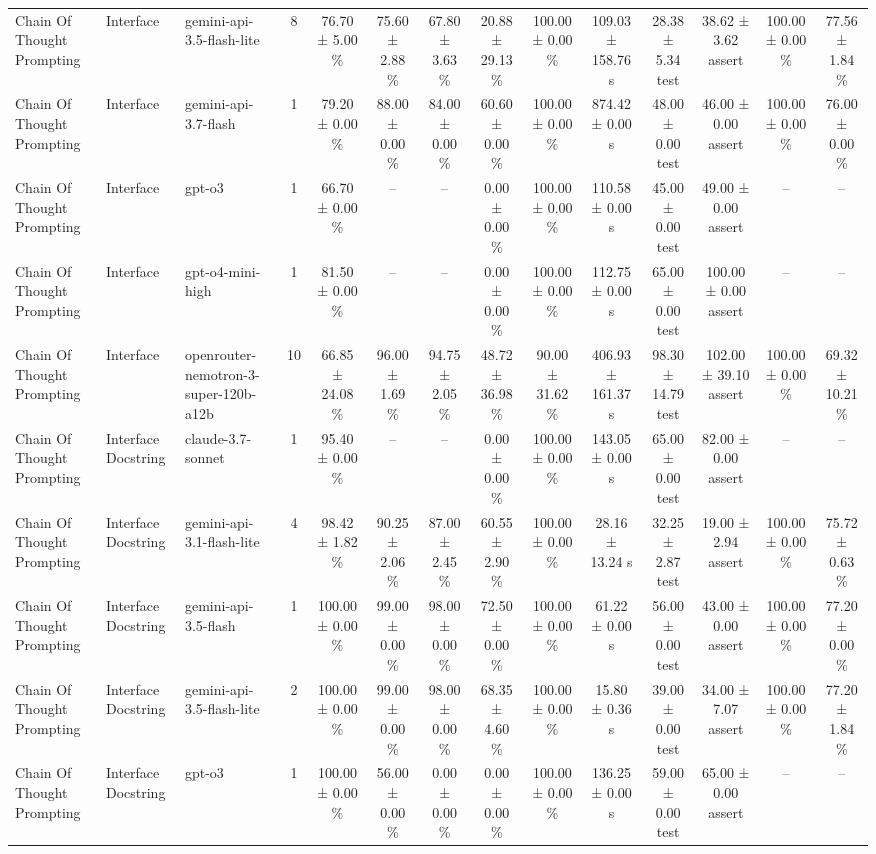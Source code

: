 \begin{table}[htbp]
\begin{tabular}{lllccccccccccc}
Chain Of Thought Prompting & Interface & gemini-api-3.5-flash-lite & 8 & 76.70 ± 5.00 \% & 75.60 ± 2.88 \% & 67.80 ± 3.63 \% & 20.88 ± 29.13 \% & 100.00 ± 0.00 \% & 109.03 ± 158.76 s & 28.38 ± 5.34 test & 38.62 ± 3.62 assert & 100.00 ± 0.00 \% & 77.56 ± 1.84 \% \\
Chain Of Thought Prompting & Interface & gemini-api-3.7-flash & 1 & 79.20 ± 0.00 \% & 88.00 ± 0.00 \% & 84.00 ± 0.00 \% & 60.60 ± 0.00 \% & 100.00 ± 0.00 \% & 874.42 ± 0.00 s & 48.00 ± 0.00 test & 46.00 ± 0.00 assert & 100.00 ± 0.00 \% & 76.00 ± 0.00 \% \\
Chain Of Thought Prompting & Interface & gpt-o3 & 1 & 66.70 ± 0.00 \% & – & – & 0.00 ± 0.00 \% & 100.00 ± 0.00 \% & 110.58 ± 0.00 s & 45.00 ± 0.00 test & 49.00 ± 0.00 assert & – & – \\
Chain Of Thought Prompting & Interface & gpt-o4-mini-high & 1 & 81.50 ± 0.00 \% & – & – & 0.00 ± 0.00 \% & 100.00 ± 0.00 \% & 112.75 ± 0.00 s & 65.00 ± 0.00 test & 100.00 ± 0.00 assert & – & – \\
Chain Of Thought Prompting & Interface & openrouter-nemotron-3-super-120b-a12b & 10 & 66.85 ± 24.08 \% & 96.00 ± 1.69 \% & 94.75 ± 2.05 \% & 48.72 ± 36.98 \% & 90.00 ± 31.62 \% & 406.93 ± 161.37 s & 98.30 ± 14.79 test & 102.00 ± 39.10 assert & 100.00 ± 0.00 \% & 69.32 ± 10.21 \% \\
Chain Of Thought Prompting & Interface Docstring & claude-3.7-sonnet & 1 & 95.40 ± 0.00 \% & – & – & 0.00 ± 0.00 \% & 100.00 ± 0.00 \% & 143.05 ± 0.00 s & 65.00 ± 0.00 test & 82.00 ± 0.00 assert & – & – \\
Chain Of Thought Prompting & Interface Docstring & gemini-api-3.1-flash-lite & 4 & 98.42 ± 1.82 \% & 90.25 ± 2.06 \% & 87.00 ± 2.45 \% & 60.55 ± 2.90 \% & 100.00 ± 0.00 \% & 28.16 ± 13.24 s & 32.25 ± 2.87 test & 19.00 ± 2.94 assert & 100.00 ± 0.00 \% & 75.72 ± 0.63 \% \\
Chain Of Thought Prompting & Interface Docstring & gemini-api-3.5-flash & 1 & 100.00 ± 0.00 \% & 99.00 ± 0.00 \% & 98.00 ± 0.00 \% & 72.50 ± 0.00 \% & 100.00 ± 0.00 \% & 61.22 ± 0.00 s & 56.00 ± 0.00 test & 43.00 ± 0.00 assert & 100.00 ± 0.00 \% & 77.20 ± 0.00 \% \\
Chain Of Thought Prompting & Interface Docstring & gemini-api-3.5-flash-lite & 2 & 100.00 ± 0.00 \% & 99.00 ± 0.00 \% & 98.00 ± 0.00 \% & 68.35 ± 4.60 \% & 100.00 ± 0.00 \% & 15.80 ± 0.36 s & 39.00 ± 0.00 test & 34.00 ± 7.07 assert & 100.00 ± 0.00 \% & 77.20 ± 1.84 \% \\
Chain Of Thought Prompting & Interface Docstring & gpt-o3 & 1 & 100.00 ± 0.00 \% & 56.00 ± 0.00 \% & 0.00 ± 0.00 \% & 0.00 ± 0.00 \% & 100.00 ± 0.00 \% & 136.25 ± 0.00 s & 59.00 ± 0.00 test & 65.00 ± 0.00 assert & – & – \\

\end{tabular}
\end{table}
